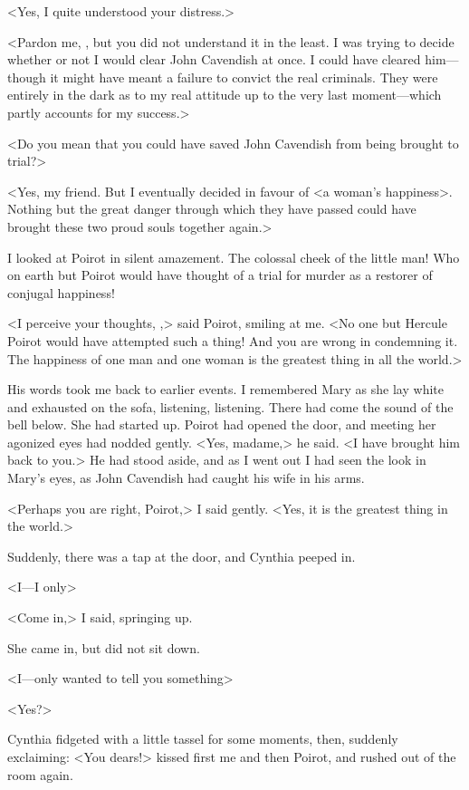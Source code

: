  <Yes, I quite understood your distress.> 

 <Pardon me, , but you did not understand it in the least. I was trying to decide whether or not I would clear John Cavendish at once. I could have cleared him—though it might have meant a failure to convict the real criminals. They were entirely in the dark as to my real attitude up to the very last moment—which partly accounts for my success.> 

 <Do you mean that you could have saved John Cavendish from being brought to trial?> 

 <Yes, my friend. But I eventually decided in favour of <a woman's happiness>. Nothing but the great danger through which they have passed could have brought these two proud souls together again.> 

 I looked at Poirot in silent amazement. The colossal cheek of the little man! Who on earth but Poirot would have thought of a trial for murder as a restorer of conjugal happiness! 

 <I perceive your thoughts, ,> said Poirot, smiling at me. <No one but Hercule Poirot would have attempted such a thing! And you are wrong in condemning it. The happiness of one man and one woman is the greatest thing in all the world.> 

 His words took me back to earlier events. I remembered Mary as she lay white and exhausted on the sofa, listening, listening. There had come the sound of the bell below. She had started up. Poirot had opened the door, and meeting her agonized eyes had nodded gently. <Yes, madame,> he said. <I have brought him back to you.> He had stood aside, and as I went out I had seen the look in Mary's eyes, as John Cavendish had caught his wife in his arms. 

 <Perhaps you are right, Poirot,> I said gently. <Yes, it is the greatest thing in the world.> 

 Suddenly, there was a tap at the door, and Cynthia peeped in. 

 <I—I only\longdash> 

 <Come in,> I said, springing up. 

 She came in, but did not sit down. 

 <I—only wanted to tell you something\longdash> 

 <Yes?> 

 Cynthia fidgeted with a little tassel for some moments, then, suddenly exclaiming: <You dears!> kissed first me and then Poirot, and rushed out of the room again. 

